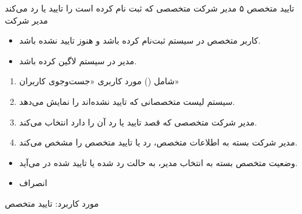 {
\usecase
{تایید متخصص}
{۵}
{مدیر شرکت متخصصی که ثبت نام کرده است را تایید یا رد می‌کند}
{مدیر شرکت}
{}
{
	\begin{itemize}
	\item 
	کاربر متخصص در سیستم ثبت‌نام کرده باشد و هنوز تایید نشده باشد.
	
	\item
مدیر در سیستم لاگین کرده باشد.
\end{itemize}
}
{
\begin{enumerate}
	\item 
	شامل () مورد کاربری «جست‌وجوی کاربران»
	\item
	سیستم لیست متخصصانی که تایید نشده‌اند را نمایش می‌دهد.
	
	\item 
	مدیر شرکت متخصصی که قصد تایید یا رد آن را دارد انتخاب می‌کند.
	
	\item 
	مدیر شرکت بسته به اطلاعات متخصص، رد یا تایید متخصص را مشخص می‌کند.
\end{enumerate}
}
{\begin{itemize}
	\item
	وضعیت متخصص بسته به انتخاب مدیر، به حالت رد شده یا تایید شده در می‌آید.
\end{itemize}}
{
\begin{itemize}
	\item
	 انصراف
\end{itemize}
}
{مورد کاربرد: تایید متخصص}




}

